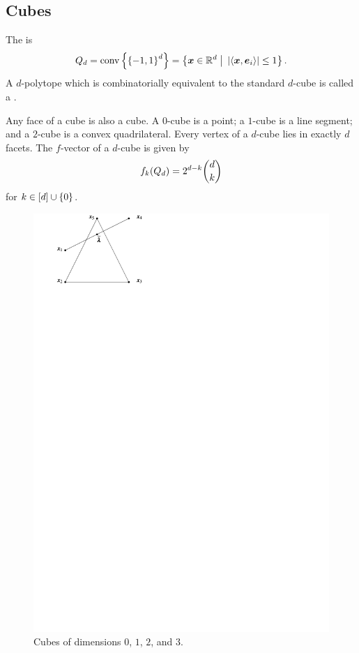    \subsection{Cubes}

    The  is
        \[
        \cube d
                =   \conv\seta{\seta{-1,1}^d}
                =   \setb{\ve x\in\R d}{\abs{\ip{\ve x}{\ve e_i}}\le1}.
        \]
    A \(d\)-polytope which is combinatorially equivalent to the standard \(d\)-cube is called a .

    Any face of a cube is also a cube.  A \(0\)-cube is a point; a \(1\)-cube is a line segment; and a \(2\)-cube is a convex quadrilateral.  Every vertex of a \(d\)-cube lies in exactly \(d\) facets.  The \(f\)-vector of a \(d\)-cube is given by
        \[
            f_k(Q_{d})
                =   2^{d-k}\binom d k
        \]
    for \(k\in\left[d\right]\cup\left\{0\right\}\).

    \begin{center}
        \begin{figure}[h!tb]
            \includegraphics[page=5, width=.8\textwidth]{pictures.pdf}
            \caption{Cubes of dimensions $0$, $1$, $2$, and $3$.}
        \end{figure}
    \end{center}


